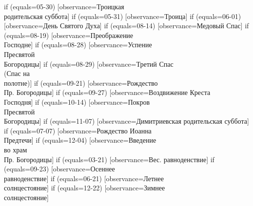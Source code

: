 {  if (equals=05-30) [observance=Троицкая\\ родительская суббота]
  if (equals=05-31) [observance=Троица]
  if (equals=06-01) [observance=День Святого Духа]
  if (equals=08-14) [observance=Медовый Спас]
  if (equals=08-19) [observance=Преображение\\ Господне]
  if (equals=08-28) [observance=Успение\\ Пресвятой\\ Богородицы]
  if (equals=08-29) [observance=Третий Спас\\ (Спас на\\ полотне)]
  if (equals=09-21) [observance=Рождество\\ Пр. Богородицы]
  if (equals=09-27) [observance=Воздвижение Креста\\ Господня]
  if (equals=10-14) [observance=Покров\\ Пресвятой\\ Богородицы]
  if (equals=11-07) [observance=Димитриевская родительская суббота]
  if (equals=07-07) [observance=Рождество Иоанна\\ Предтечи]
  if (equals=12-04) [observance=Введение\\ во храм\\ Пр. Богородицы]
  if (equals=03-21) [observance=Вес. равноденствие]
  if (equals=09-23) [observance=Осеннее\\ равноденствие]
  if (equals=06-21) [observance=Летнее\\ солнцестояние]
  if (equals=12-22) [observance=Зимнее\\ солнцестояние]
}
